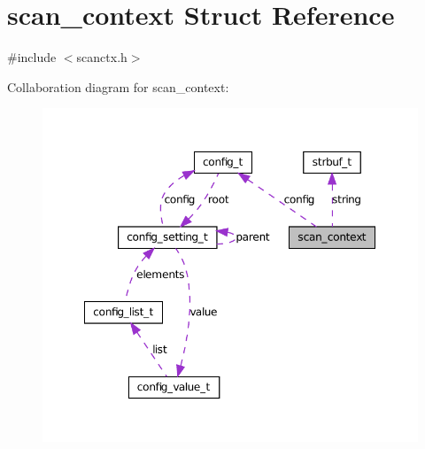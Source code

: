 \hypertarget{structscan__context}{
\section{scan\_\-context Struct Reference}
\label{structscan__context}
}


{\ttfamily \#include $<$scanctx.h$>$}



Collaboration diagram for scan\_\-context:
\nopagebreak
\begin{figure}[H]
\begin{center}
\leavevmode
\includegraphics[width=351pt]{structscan__context__coll__graph}
\end{center}
\end{figure}
